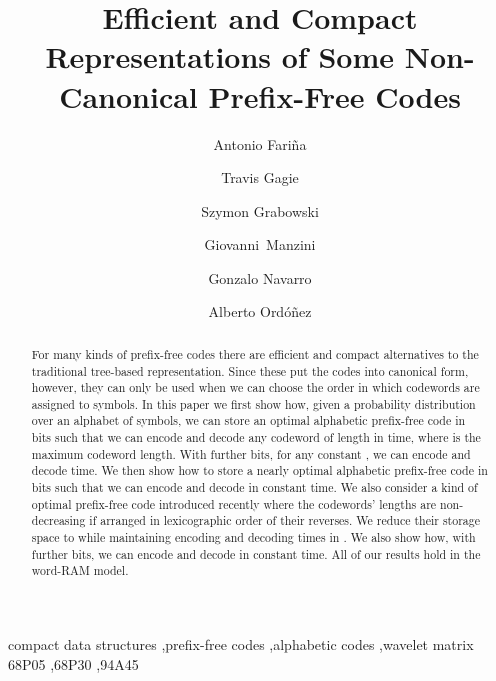 \documentclass[preprint,12pt]{elsarticle}
\begin{document}
\begin{frontmatter}

\title{Efficient and Compact Representations of Some Non-Canonical Prefix-Free Codes}

\author[udc]{Antonio Fari\~na}
\author[udp,cebib]{Travis Gagie}
\author[lodz]{Szymon Grabowski}
\author[upo,cnr]{\mbox{Giovanni Manzini}}
\author[cebib,imfd,chile]{Gonzalo Navarro}
\author[ebay]{Alberto Ord\'o\~nez}


\address[udc]{Universidade da Coru\~na and Centro de Investigaci\'on CITIC, A Coru\~na, Spain}
\address[udp]{Dalhousie University, Canada}
\address[cebib]{Center for Biotechnology and Bioengineering (CeBiB), Chile}
\address[lodz]{Institute of Applied Computer Science, Lodz University of Technology, Poland}
\address[upo]{Department of Computer Science, University of Pisa, Italy}
\address[cnr]{IIT-CNR, Pisa, Italy}
\address[imfd]{Millennium Institute for Foundational Research on Data (IMFD), Chile}
\address[chile]{Department of Computer Science, University of Chile, Chile}
\address[ebay]{Pinterest Inc., CA, USA}

\begin{abstract}
For many kinds of prefix-free codes there are efficient and compact alternatives to the traditional tree-based representation.  Since these put the codes into canonical form, however, they can only be used when we can choose the order in which codewords are assigned to symbols.  In this paper we first show how, given a probability distribution over an alphabet of  symbols, we can store an optimal alphabetic prefix-free code in  bits such that we can encode and decode any codeword of length  in  time, where  is the maximum codeword length.  With  further bits, for any constant , we can encode and decode  time.  We then show how to store a nearly optimal alphabetic prefix-free code in  bits such that we can encode and decode in constant time.  We also consider a kind of optimal prefix-free code introduced recently where the codewords' lengths are non-decreasing if arranged in lexicographic order of their reverses.  We reduce their storage space to  while maintaining encoding and decoding times in . We also show how, with  further bits, we can encode and decode in constant time.
All of our results hold in the word-RAM model.
\end{abstract}

\begin{keyword}
compact data structures \sep prefix-free codes \sep alphabetic codes \sep wavelet matrix
\MSC[2010] 68P05 \sep 68P30 \sep 94A45
\end{keyword}

\end{frontmatter}
\end{document}
